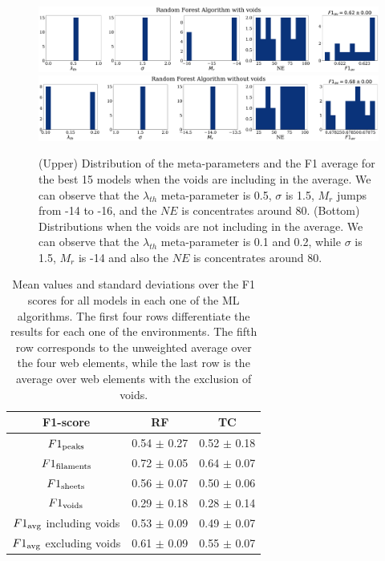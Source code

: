 \documentclass[usenatbib]{mnras}
\begin{document}
\begin{figure}
\centering
    \includegraphics[scale=0.23]{Figs/p_features_Forest_F1_av.pdf}
    \includegraphics[scale=0.23]{Figs/p_features_Forest_F1_av_no_voids.pdf}
    \caption{(Upper) Distribution of the meta-parameters and the F1 average for the best 15 models when the voids are including in the average. We can observe that  the $\lambda_{th}$ meta-parameter is 0.5, $\sigma$ is 1.5, $M_r$ jumps from -14 to -16, and the $NE$ is concentrates around 80.
    (Bottom) Distributions when the voids are not including in the average. We can observe that the $\lambda_{th}$ meta-parameter is 0.1 and 0.2, while $\sigma$ is 1.5, $M_r$ is -14 and also the $NE$ is concentrates around 80.
      } 
    \label{fig:features_score}    
\end{figure}


\begin{table}
\centering
\begin{tabular}{ccc}
\hline
 F1-score                   & RF              & TC              \\
\hline
 $F1_{\rm peaks}$               & 0.54 $\pm$ 0.27 & 0.52 $\pm$ 0.18 \\
 $F1_{\rm filaments}$           & 0.72 $\pm$ 0.05 & 0.64 $\pm$ 0.07 \\
 $F1_{\rm sheets}$              & 0.56 $\pm$ 0.07 & 0.50 $\pm$ 0.06  \\
 $F1_{\rm voids}$               & 0.29 $\pm$ 0.18 & 0.28 $\pm$ 0.14 \\
 $F1_{\rm avg}$ including voids    & 0.53 $\pm$ 0.09 & 0.49 $\pm$ 0.07 \\
 $F1_{\rm avg}$ excluding voids & 0.61 $\pm$ 0.09 & 0.55 $\pm$ 0.07 \\
\hline
\end{tabular}
\caption{Mean values and standard deviations over the F1
  scores for all models in each one of the ML algorithms.
  The first four rows differentiate the results for each one of the
  environments.
  The fifth row corresponds to the unweighted average over the four
  web elements, while the last row is the average over web elements
  with the exclusion of voids.}
\label{table:elements}
\end{table}
\end{document}
